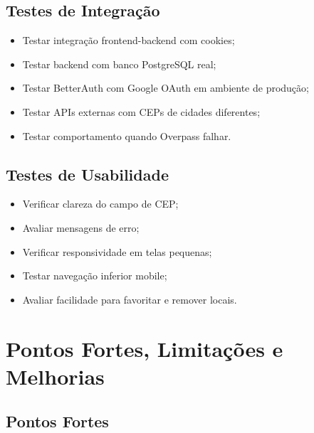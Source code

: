 \documentclass[
    12pt,
    oneside,
    openright,
    a4paper,
    english,
    brazil
]{abntex2}
\begin{document}
\section{Testes de Integração}

\begin{itemize}
    \item Testar integração frontend-backend com cookies;
    \item Testar backend com banco PostgreSQL real;
    \item Testar BetterAuth com Google OAuth em ambiente de produção;
    \item Testar APIs externas com CEPs de cidades diferentes;
    \item Testar comportamento quando Overpass falhar.
\end{itemize}

\section{Testes de Usabilidade}

\begin{itemize}
    \item Verificar clareza do campo de CEP;
    \item Avaliar mensagens de erro;
    \item Verificar responsividade em telas pequenas;
    \item Testar navegação inferior mobile;
    \item Avaliar facilidade para favoritar e remover locais.
\end{itemize}


\chapter{Pontos Fortes, Limitações e Melhorias}

\section{Pontos Fortes}
\end{document}
